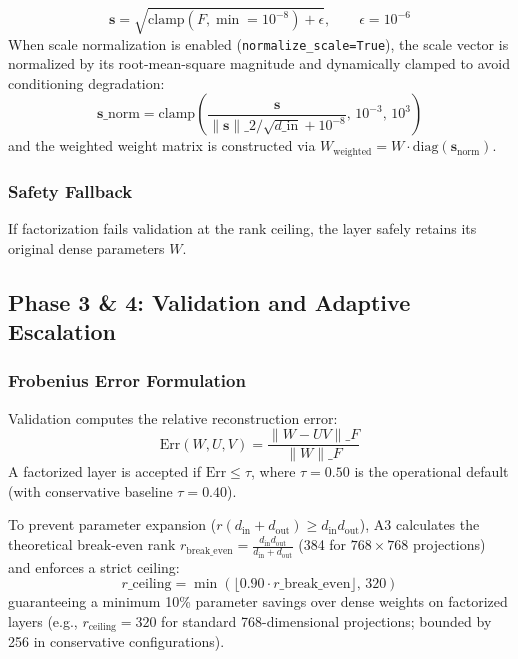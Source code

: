 \[
\mathbf{s} = \sqrt{\mathrm{clamp}(F, \min=10^{-8}) + \epsilon}, \qquad \epsilon = 10^{-6}
\tag{4.8}
\]
When scale normalization is enabled (\texttt{normalize\_scale=True}), the scale vector is normalized by its root-mean-square magnitude and dynamically clamped to avoid conditioning degradation:
\[
\mathbf{s}\_{\mathrm{norm}} = \mathrm{clamp}\!\left(\frac{\mathbf{s}}{\|\mathbf{s}\|\_2 / \sqrt{d\_{\mathrm{in}}} + 10^{-8}},\, 10^{-3},\, 10^{3}\right)
\tag{4.9}
\]
and the weighted weight matrix is constructed via $W_{\mathrm{weighted}} = W \cdot \mathrm{diag}(\mathbf{s}_{\mathrm{norm}})$.

\subsubsection{Safety Fallback}

If factorization fails validation at the rank ceiling, the layer safely retains its original dense parameters $W$.

\subsection{Phase 3 \& 4: Validation and Adaptive Escalation}
\label{sec:frobenius_validation}

\subsubsection{Frobenius Error Formulation}

Validation computes the relative reconstruction error:
\[
\mathrm{Err}(W, U, V) = \frac{\|W - U V\|\_F}{\|W\|\_F}
\tag{4.10}
\]
A factorized layer is accepted if $\mathrm{Err} \le \tau$, where $\tau = 0.50$ is the operational default (with conservative baseline $\tau = 0.40$).

To prevent parameter expansion ($r(d_{\mathrm{in}} + d_{\mathrm{out}}) \ge d_{\mathrm{in}} d_{\mathrm{out}}$), A3 calculates the theoretical break-even rank $r_{\mathrm{break\_even}} = \frac{d_{\mathrm{in}} d_{\mathrm{out}}}{d_{\mathrm{in}} + d_{\mathrm{out}}}$ (384 for $768 \times 768$ projections) and enforces a strict ceiling:
\[
r\_{\mathrm{ceiling}} = \min\!\left(\lfloor 0.90 \cdot r\_{\mathrm{break\_even}} \rfloor,\, 320\right)
\tag{4.10a}
\]
guaranteeing a minimum 10\% parameter savings over dense weights on factorized layers (e.g., $r_{\mathrm{ceiling}} = 320$ for standard 768-dimensional projections; bounded by 256 in conservative configurations).

